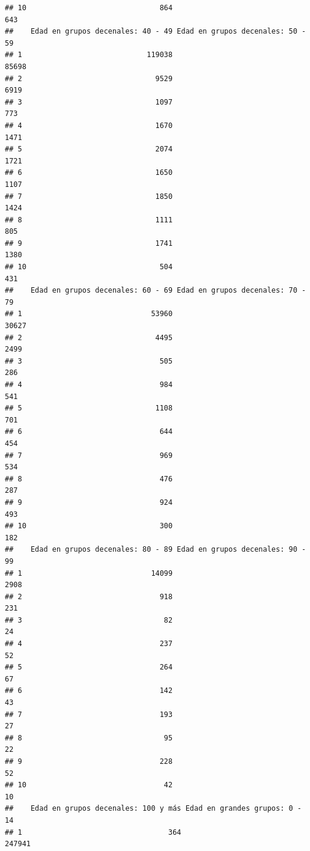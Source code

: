 \documentclass[11pt,]{article}
\begin{document}
\begin{verbatim}
## 10                               864                               643
##    Edad en grupos decenales: 40 - 49 Edad en grupos decenales: 50 - 59
## 1                             119038                             85698
## 2                               9529                              6919
## 3                               1097                               773
## 4                               1670                              1471
## 5                               2074                              1721
## 6                               1650                              1107
## 7                               1850                              1424
## 8                               1111                               805
## 9                               1741                              1380
## 10                               504                               431
##    Edad en grupos decenales: 60 - 69 Edad en grupos decenales: 70 - 79
## 1                              53960                             30627
## 2                               4495                              2499
## 3                                505                               286
## 4                                984                               541
## 5                               1108                               701
## 6                                644                               454
## 7                                969                               534
## 8                                476                               287
## 9                                924                               493
## 10                               300                               182
##    Edad en grupos decenales: 80 - 89 Edad en grupos decenales: 90 - 99
## 1                              14099                              2908
## 2                                918                               231
## 3                                 82                                24
## 4                                237                                52
## 5                                264                                67
## 6                                142                                43
## 7                                193                                27
## 8                                 95                                22
## 9                                228                                52
## 10                                42                                10
##    Edad en grupos decenales: 100 y más Edad en grandes grupos: 0 - 14
## 1                                  364                         247941

\end{verbatim}
\end{document}
